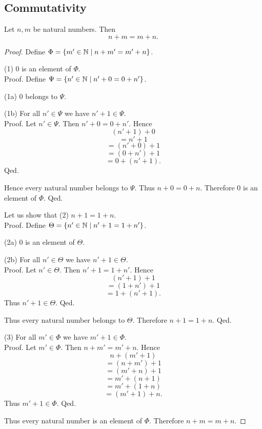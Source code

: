 \documentclass[10pt]{article}
\begin{document}
  \subsection{Commutativity}

  \begin{forthel}
    \begin{proposition}
      Let $n, m$ be natural numbers.
      Then \[ n + m = m + n. \]
    \end{proposition}
    \begin{proof}
      Define $\Phi = \{ m' \in \mathbb{N} \mid n + m' = m' + n \}$.

      (1) $0$ is an element of $\Phi$. \\
      Proof.
        Define $\Psi = \{ n' \in \mathbb{N} \mid n' + 0 = 0 + n' \}$.

        (1a) $0$ belongs to $\Psi$.

        (1b) For all $n' \in \Psi$ we have $n' + 1 \in \Psi$. \\
        Proof.
          Let $n' \in \Psi$.
          Then $n' + 0 = 0 + n'$.
          Hence
          \[  (n' + 1) + 0        \]
          \[    = n' + 1          \]
          \[    = (n' + 0) + 1    \]
          \[    = (0 + n') + 1    \]
          \[    = 0 + (n' + 1).   \]
        Qed.

        Hence every natural number belongs to $\Psi$.
        Thus $n + 0 = 0 + n$.
        Therefore $0$ is an element of $\Phi$.
      Qed.

      Let us show that (2) $n + 1 = 1 + n$. \\
      Proof.
        Define $\Theta = \{ n' \in \mathbb{N} \mid n' + 1 = 1 + n' \}$.

        (2a) $0$ is an element of $\Theta$.

        (2b) For all $n' \in \Theta$ we have $n' + 1 \in \Theta$. \\
        Proof.
          Let $n' \in \Theta$.
          Then $n' + 1 = 1 + n'$.
          Hence
          \[  (n' + 1) + 1        \]
          \[    = (1 + n') + 1    \]
          \[    = 1 + (n' + 1).   \]
          Thus $n' + 1 \in \Theta$.
        Qed.

        Thus every natural number belongs to $\Theta$.
        Therefore $n + 1 = 1 + n$.
      Qed.

      (3) For all $m' \in \Phi$ we have $m' + 1 \in \Phi$. \\
      Proof.
        Let $m' \in \Phi$.
        Then $n + m' = m' + n$.
        Hence
        \[  n + (m'  + 1)       \]
        \[    = (n + m') + 1    \]
        \[    = (m' + n) + 1    \]
        \[    = m' + (n + 1)    \]
        \[    = m' + (1 + n)    \]
        \[    = (m' + 1) + n.   \]
        Thus $m' + 1 \in \Phi$.
      Qed.

      Thus every natural number is an element of $\Phi$.
      Therefore $n + m = m + n$.
    \end{proof}
  \end{forthel}
\end{document}
